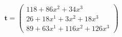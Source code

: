 \documentclass[preview]{standalone}
\begin{document}
\begin{align*}
\mathbf{t} = \begin{pmatrix}118 + 86x^{2} + 34x^{3} \\ 26 + 18x^{1} + 3x^{2} + 18x^{3} \\ 89 + 63x^{1} + 116x^{2} + 126x^{3}\end{pmatrix}
\end{align*}
\end{document}
